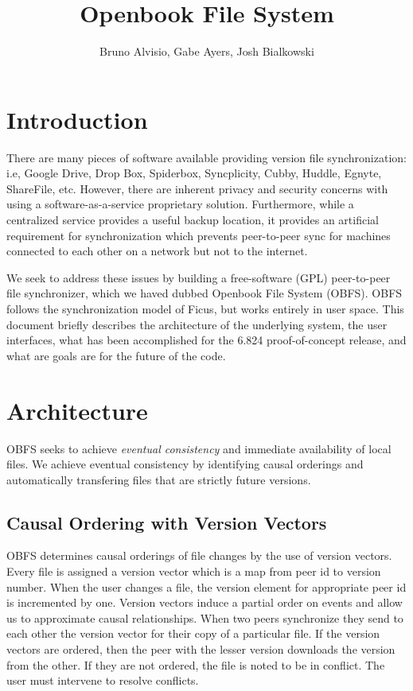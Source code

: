\documentclass[10pt,twocolumn]{article}
\title{ \vspace{-3cm} Openbook File System \vspace{-0.5cm} }
\author{ Bruno Alvisio, Gabe Ayers, Josh Bialkowski}
\begin{document}
\maketitle
\section{Introduction}

There are many pieces of software available providing version file 
synchronization: i.e, Google Drive, Drop Box, Spiderbox, Syncplicity, Cubby,
Huddle, Egnyte, ShareFile, etc. However, there are inherent privacy and 
security concerns with using a software-as-a-service proprietary solution. 
Furthermore, while a centralized service provides a useful backup location, it
provides an artificial requirement for synchronization which prevents 
peer-to-peer sync for machines connected to each other on a network but not
to the internet.

We seek to address these issues by building a free-software (GPL) peer-to-peer
file synchronizer, which we haved dubbed Openbook File System (OBFS). OBFS
follows the synchronization model of Ficus, but works entirely in user space. 
This document briefly describes the architecture of the underlying system, 
the user interfaces, what has been accomplished for the 6.824 
proof-of-concept release, and what are goals are for the future of the code.  

\section{Architecture}

OBFS seeks to achieve \emph{eventual consistency} and immediate availability 
of local files. We achieve eventual consistency by identifying causal orderings
and automatically transfering files that are strictly future versions. 

\subsection{Causal Ordering with Version Vectors}
OBFS determines causal orderings of file changes by the use of version
vectors. Every file is assigned a version vector which is a map from peer id to
version number. When the user changes a file, the version element for appropriate
peer id is incremented by one. Version vectors induce a partial order on events
and allow us to approximate causal relationships. When two peers synchronize
they send to each other the version vector for their copy of a particular file.
If the version vectors are ordered, then the peer with the lesser version
downloads the version from the other. If they are not ordered, the file is noted
to be in conflict. The user must intervene to resolve conflicts.
\end{document}
